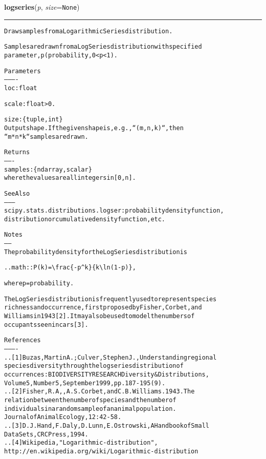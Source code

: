 \hspace{.8\funcindent}\begin{boxedminipage}{\funcwidth}

    \raggedright \textbf{logseries}(\textit{p}, \textit{size}={\tt None})

    \vspace{-1.5ex}

    \rule{\textwidth}{0.5\fboxrule}
\setlength{\parskip}{2ex}
\begin{alltt}
Draw samples from a Logarithmic Series distribution.

Samples are drawn from a Log Series distribution with specified
parameter, p (probability, 0 {\textless} p {\textless} 1).

Parameters
----------
loc : float

scale : float {\textgreater} 0.

size : \{tuple, int\}
    Output shape.  If the given shape is, e.g., ``(m, n, k)``, then
    ``m * n * k`` samples are drawn.

Returns
-------
samples : \{ndarray, scalar\}
          where the values are all integers in  [0, n].

See Also
--------
scipy.stats.distributions.logser : probability density function,
    distribution or cumulative density function, etc.

Notes
-----
The probability density for the Log Series distribution is

.. math:: P(k) = {\textbackslash}frac\{-p{\textasciicircum}k\}\{k {\textbackslash}ln(1-p)\},

where p = probability.

The Log Series distribution is frequently used to represent species
richness and occurrence, first proposed by Fisher, Corbet, and
Williams in 1943 [2].  It may also be used to model the numbers of
occupants seen in cars [3].

References
----------
.. [1] Buzas, Martin A.; Culver, Stephen J.,  Understanding regional
       species diversity through the log series distribution of
       occurrences: BIODIVERSITY RESEARCH Diversity \& Distributions,
       Volume 5, Number 5, September 1999 , pp. 187-195(9).
.. [2] Fisher, R.A,, A.S. Corbet, and C.B. Williams. 1943. The
       relation between the number of species and the number of
       individuals in a random sample of an animal population.
       Journal of Animal Ecology, 12:42-58.
.. [3] D. J. Hand, F. Daly, D. Lunn, E. Ostrowski, A Handbook of Small
       Data Sets, CRC Press, 1994.
.. [4] Wikipedia, "Logarithmic-distribution",
       http://en.wikipedia.org/wiki/Logarithmic-distribution


\end{alltt}
\end{boxedminipage}
